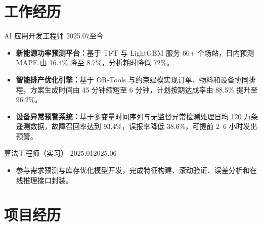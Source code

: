 \documentclass{claritycv}
\begin{document}
\section{工作经历}

  {AI 应用开发工程师}
  {2025.07}{至今}
\begin{itemize}
  \item \textbf{新能源功率预测平台：}基于 TFT 与 LightGBM 服务 60+ 个场站，日内预测 MAPE 由 16.4\% 降至 8.7\%，分析耗时降低 72\%。
  \item \textbf{智能排产优化引擎：}基于 OR-Tools 与约束建模实现订单、物料和设备协同排程，方案生成时间由 45 分钟缩短至 6 分钟，计划按期达成率由 88.5\% 提升至 96.2\%。
  \item \textbf{设备异常预警系统：}基于多变量时间序列与无监督异常检测处理日均 120 万条遥测数据，故障召回率达到 93.4\%，误报率降低 38.6\%，可提前 2--6 小时发出预警。
\end{itemize}

  {算法工程师（实习）}
  {2025.01}{2025.06}
\begin{itemize}
  \item 参与需求预测与库存优化模型开发，完成特征构建、滚动验证、误差分析和在线推理接口封装。
\end{itemize}

\section{项目经历}
\end{document}
